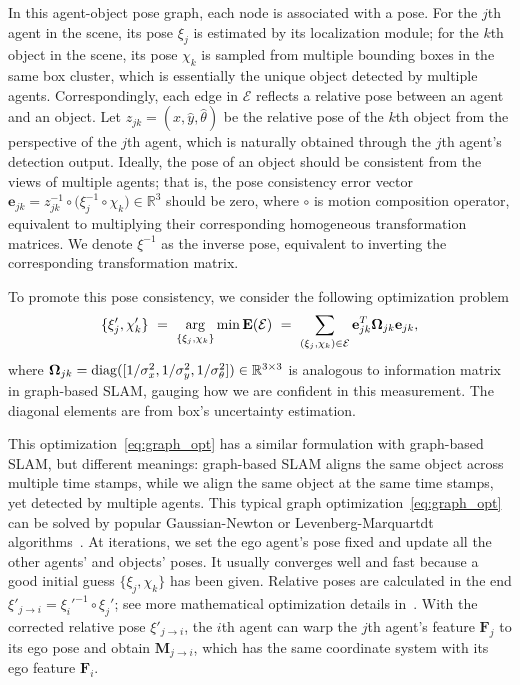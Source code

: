 \documentclass[letterpaper, 10 pt, conference]{ieeeconf}  %
\begin{document}
In this agent-object pose graph, each node is associated with a pose. For the $j$th agent in the scene, its pose $\xi_j$ is estimated by its localization module;  for the $k$th object in the scene, its pose $\chi_k$ is sampled from multiple bounding boxes in the same box cluster, which is essentially the unique object detected by multiple agents. Correspondingly, each edge in $\mathcal{E}$ reflects a relative pose between an agent and an object. Let $z_{jk} = (\widehat{x},\widehat{y},\widehat{\theta}) $ be the relative pose of the $k$th object from the perspective of the $j$th agent, which is naturally obtained through the $j$th agent's detection output. Ideally, the pose of an object should be consistent from the views of multiple agents; that is, the pose consistency error vector $\mathbf{e}_{jk} = {z_{jk}^{-1} \circ ( \xi_{j}^{-1} \circ \chi_{k}}) \in \mathbb{R}^3$ should be zero,  where $\circ$ is motion composition operator, equivalent to multiplying their corresponding homogeneous transformation matrices. We denote $\xi^{-1}$ as the inverse pose, equivalent to inverting the corresponding transformation matrix.

To promote this pose consistency, we consider the following optimization problem
\vspace{-1mm}
\begin{equation}
\label{eq:graph_opt}
\{\xi'_{j}, \chi'_{k} \} \ = \  \underset{ \{\xi_j, \chi_{k} \} } \arg \min \mathbf{E}( \mathcal{E} ) \ = \ \sum_{(\xi_j, \chi_{k}) \in \mathcal{E}} \mathbf{e}_{jk}^{T} \mathbf{\Omega}_{jk} \mathbf{e}_{jk},
\vspace{-1mm}
\end{equation}
where $\mathbf{\Omega}_{jk} = {\rm diag}([1/\sigma_{x}^2, 1/\sigma_{y}^2, 1/\sigma_{\theta}^2]) \in \mathbb{R}^{3 \times 3}$ is analogous to information matrix in graph-based SLAM, gauging how we are confident in this measurement. The diagonal elements are from box's uncertainty estimation.

This optimization~\eqref{eq:graph_opt} has a similar formulation with graph-based SLAM, but different meanings: graph-based SLAM aligns the same object across multiple time stamps, while we align the same object at the same time stamps, yet detected by multiple agents. This typical graph optimization~\eqref{eq:graph_opt} can be solved by popular Gaussian-Newton or Levenberg-Marquartdt algorithms~\cite{levenberg1944method}. At iterations, we set the ego agent's pose fixed and update all the other agents' and objects' poses. It usually converges well and fast because a good initial guess $\{\xi_j, \chi_k\}$ has been given. Relative poses are calculated in the end $\xi'_{j \rightarrow i} = \xi_{i}'^{-1} \circ \xi_{j}'$; see more mathematical optimization details in~\cite{grisetti2011g2o}. With the corrected relative pose $\xi'_{j \rightarrow i}$, the $i$th agent can warp the $j$th agent's feature $\mathbf{F}_j$ to its ego pose and obtain $\mathbf{M}_{j \rightarrow i}$, which has the same coordinate system with its ego feature $\mathbf{F}_i$.
\end{document}
